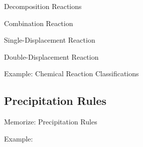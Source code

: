 \documentclass[11pt]{beamer}
\begin{document}
\begin{frame}{Decomposition Reactions}
\end{frame}

\begin{frame}{Combination Reaction}
\end{frame}

\begin{frame}{Single-Displacement Reaction}
\end{frame}

\begin{frame}{Double-Displacement Reaction}
\end{frame}

\begin{frame}{Example: Chemical Reaction Classifications}
\end{frame}

\subsection{Precipitation Rules}

\begin{frame}{Memorize: Precipitation Rules}
\end{frame}

\begin{frame}{Example:}
\end{frame}
\end{document}
